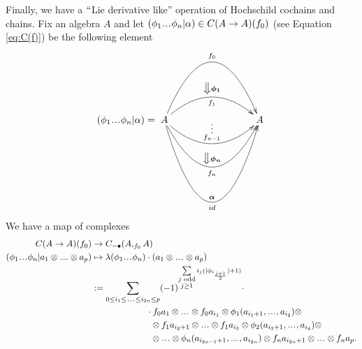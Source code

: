 Finally, we have a $``$Lie derivative like'' 
operation of Hochschild cochains and chains. 
Fix an algebra $A$ and let 
$(\phi_1\smdots \phi_n|\alpha) \in C(A \to A)(f_0)$ 
(see Equation \ref{eq:C(f)}) be the following 
element
\begin{align*}
(\phi_1\smdots \phi_n|\alpha)
= 
\xymatrix{
A \ar@/^5pc/[rrr]^{f_0} 
\ar@/^2pc/[rrr]^{\bm{\big\Downarrow \phi_1}}_{f_1} 
\ar@/_2pc/[rrr]^{\substack{\vdots\\ f_{n-1}}}
\ar@/_4pc/[rrr]^{\bm{\big\Downarrow \phi_n}}_{f_n}
\ar@/_7pc/[rrr]_{id}^{\substack{\bm{\alpha}\\}}
&&& A
}
\end{align*}
We have a map of complexes 
\begin{align*}
C(A \to A)(f_0)
&\to
C_{-\bullet}(A, _{f_0}A)\\
(\phi_1\smdots \phi_n|
  a_1 \otimes \smdots \otimes a_p)
&\mapsto
\lambda(\phi_1\smdots \phi_n)\cdot 
  (a_1 \otimes \smdots \otimes a_p)\\
&:=
\sum \limits_{0 \leq i_1 \leq \smdots \leq i_{2n} \leq p}
(-1)^{\sum \limits_{\substack{
  j \textrm{ odd}\\
  j \geq 1}}
  i_j(|\phi_{i_{\frac{j+1}{2}}}| + 1)} \cdot\\ 
&\phantom{{}moveovermov{}}  
\cdot f_0a_1 \otimes \smdots \otimes f_0a_{i_1} \otimes 
\phi_1(a_{i_1+1}, \smdots, a_{i_2}) \otimes \\
&\phantom{{}moveovermove{}}
\otimes f_1a_{i_2+1} \otimes \smdots \otimes f_1a_{i_3} \otimes 
\phi_2(a_{i_3+1}, \smdots, a_{i_4}) \otimes \\
&\phantom{{}moveovermove{}}
\otimes \smdots \otimes
\phi_n(a_{i_{2n-1}+1}, \smdots, a_{i_{2n}}) \otimes
f_na_{i_{2n}+1} \otimes \smdots \otimes f_na_p.
\end{align*}
%
%
